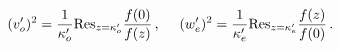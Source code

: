 \begin{equation}
(v_{o}^{\prime })^{2}={\frac{1}{\kappa _{o}^{\prime }}}\mathrm{Res}%
_{z=\kappa _{o}^{\prime }}\frac{f(0)}{f(z)}\,,~~~~(w_{e}^{\prime })^{2}={%
\frac{1}{\kappa _{e}^{\prime }}}\mathrm{Res}_{z=\kappa _{e}^{\prime }}\frac{%
f(z)}{f(0)}\,.  \label{eq:res_vwp}
\end{equation}

